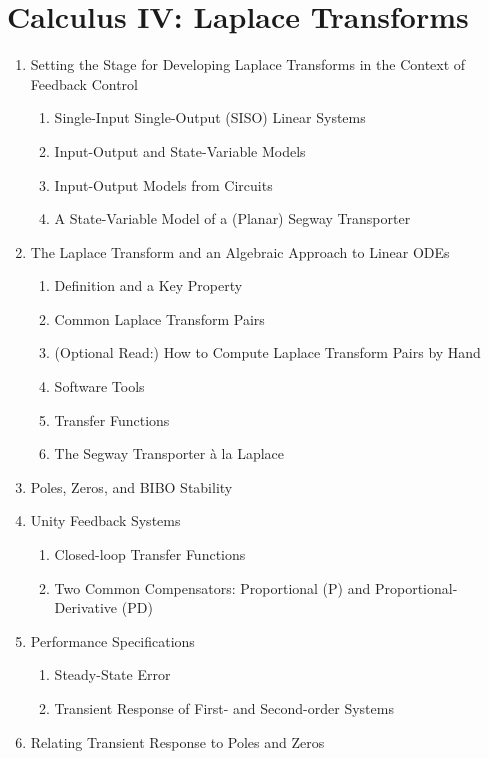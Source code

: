 \section*{Calculus IV: Laplace Transforms}
  \begin{enumerate}
  \item Setting the Stage for Developing Laplace Transforms in the Context of Feedback Control
  \begin{enumerate}
 \item Single-Input Single-Output (SISO) Linear Systems 
  \item Input-Output and State-Variable Models 
  \item Input-Output Models from Circuits 
  \item A State-Variable Model of a (Planar) Segway Transporter 
  \end{enumerate} 
  \item The Laplace Transform and an Algebraic Approach to Linear ODEs
    \begin{enumerate}
    \item Definition and a Key Property
  \item Common Laplace Transform Pairs 
  \item (Optional Read:) How to Compute Laplace Transform Pairs by Hand 
  \item Software Tools
  \item Transfer Functions 
  \item The Segway Transporter à la Laplace
  \end{enumerate} 
  \item Poles, Zeros, and BIBO Stability 
  \item Unity Feedback Systems 
  \begin{enumerate}
\item Closed-loop Transfer Functions 
    \item Two Common Compensators: Proportional (P) and Proportional-Derivative (PD) 
  \end{enumerate}
  \item Performance Specifications
    \begin{enumerate}
\item Steady-State Error 
  \item Transient Response of First- and Second-order Systems 
    \end{enumerate}
    \item Relating Transient Response to Poles and Zeros
    \begin{enumerate}

\end{enumerate}
\end{enumerate}
